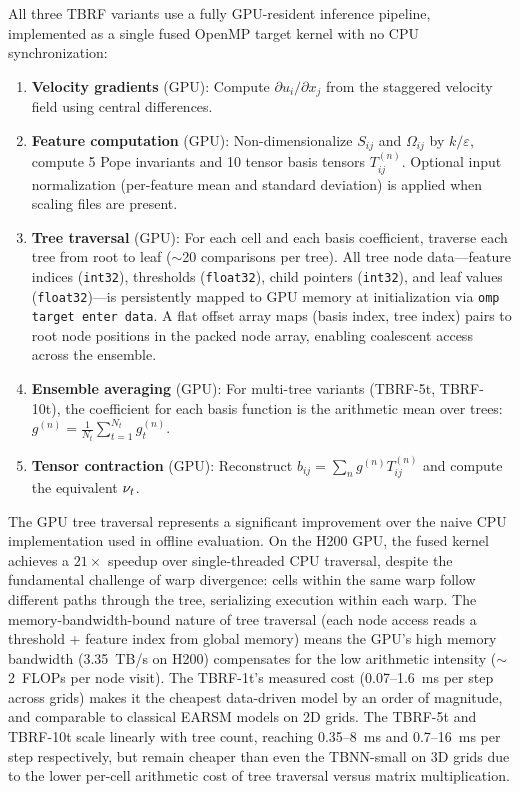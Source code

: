 All three TBRF variants use a fully GPU-resident inference pipeline, implemented as a single fused OpenMP target kernel with no CPU synchronization:
\begin{enumerate}
    \item \textbf{Velocity gradients} (GPU): Compute $\partial u_i / \partial x_j$ from the staggered velocity field using central differences.
    \item \textbf{Feature computation} (GPU): Non-dimensionalize $S_{ij}$ and $\Omega_{ij}$ by $k/\varepsilon$, compute 5 Pope invariants and 10 tensor basis tensors $T^{(n)}_{ij}$.  Optional input normalization (per-feature mean and standard deviation) is applied when scaling files are present.
    \item \textbf{Tree traversal} (GPU): For each cell and each basis coefficient, traverse each tree from root to leaf ($\sim$20 comparisons per tree). All tree node data---feature indices (\texttt{int32}), thresholds (\texttt{float32}), child pointers (\texttt{int32}), and leaf values (\texttt{float32})---is persistently mapped to GPU memory at initialization via \texttt{omp target enter data}. A flat offset array maps (basis index, tree index) pairs to root node positions in the packed node array, enabling coalescent access across the ensemble.
    \item \textbf{Ensemble averaging} (GPU): For multi-tree variants (TBRF-5t, TBRF-10t), the coefficient for each basis function is the arithmetic mean over trees: $g^{(n)} = \frac{1}{N_t}\sum_{t=1}^{N_t} g^{(n)}_t$.
    \item \textbf{Tensor contraction} (GPU): Reconstruct $b_{ij} = \sum_n g^{(n)} T^{(n)}_{ij}$ and compute the equivalent $\nu_t$.
\end{enumerate}

The GPU tree traversal represents a significant improvement over the naive CPU implementation used in offline evaluation.
On the H200 GPU, the fused kernel achieves a $21\times$ speedup over single-threaded CPU traversal, despite the fundamental challenge of warp divergence: cells within the same warp follow different paths through the tree, serializing execution within each warp.
The memory-bandwidth-bound nature of tree traversal (each node access reads a threshold + feature index from global memory) means the GPU's high memory bandwidth (3.35~TB/s on H200) compensates for the low arithmetic intensity ($\sim$2~FLOPs per node visit).
The TBRF-1t's measured cost (0.07--1.6~ms per step across grids) makes it the cheapest data-driven model by an order of magnitude, and comparable to classical EARSM models on 2D grids.
The TBRF-5t and TBRF-10t scale linearly with tree count, reaching 0.35--8~ms and 0.7--16~ms per step respectively, but remain cheaper than even the TBNN-small on 3D grids due to the lower per-cell arithmetic cost of tree traversal versus matrix multiplication.

